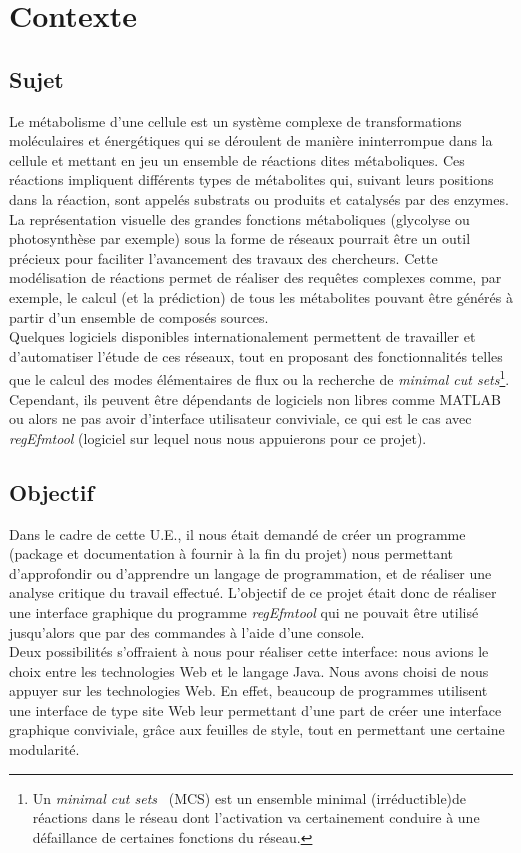 \section{Contexte}

\subsection{Sujet}
Le métabolisme d'une cellule est un système complexe de transformations moléculaires et énergétiques qui se déroulent de manière ininterrompue dans la cellule et mettant en jeu un ensemble de réactions dites métaboliques. 
Ces réactions impliquent différents types de métabolites qui, suivant leurs positions dans la réaction, sont appelés substrats ou produits et catalysés par des enzymes.\\
La représentation visuelle des grandes fonctions métaboliques (glycolyse ou photosynthèse par exemple) sous la forme de réseaux pourrait être un outil précieux pour faciliter l'avancement des travaux des chercheurs. Cette modélisation de réactions permet de réaliser des requêtes complexes comme, par exemple, le calcul (et la prédiction) de tous les métabolites pouvant être générés à partir d'un ensemble de composés sources.\\
Quelques logiciels disponibles internationalement permettent de travailler et d'automatiser l'étude de ces réseaux, tout en proposant des fonctionnalités telles que le calcul des modes élémentaires de flux ou la recherche de \textit{minimal cut sets}\footnote{Un \textit{minimal cut sets}~\cite{mcs:url} (MCS) est un ensemble minimal (irréductible)de réactions dans le réseau dont l'activation va certainement conduire à une défaillance de certaines fonctions du réseau.}. Cependant, ils peuvent être dépendants de logiciels non libres comme MATLAB ou alors ne pas avoir d'interface utilisateur conviviale, ce qui est le cas avec  \emph{regEfmtool} (logiciel sur lequel nous nous appuierons pour ce projet).

\subsection{Objectif}
Dans le cadre de cette U.E., il nous était demandé de créer un programme (package et documentation à fournir à la fin du projet) nous permettant d'approfondir ou d'apprendre un langage de programmation, et de réaliser une analyse critique du travail effectué. L'objectif de ce projet était donc de réaliser une interface graphique du programme \emph{regEfmtool} qui ne pouvait être utilisé jusqu'alors que par des commandes à l'aide d'une console. \\

Deux possibilités s'offraient à nous pour réaliser cette interface: nous avions le choix entre les technologies Web et le langage Java. Nous avons choisi de nous appuyer sur les technologies Web. En effet, beaucoup de programmes utilisent une interface de type site Web leur permettant d'une part de créer une interface graphique conviviale, grâce aux feuilles de style, tout en permettant une certaine modularité. 